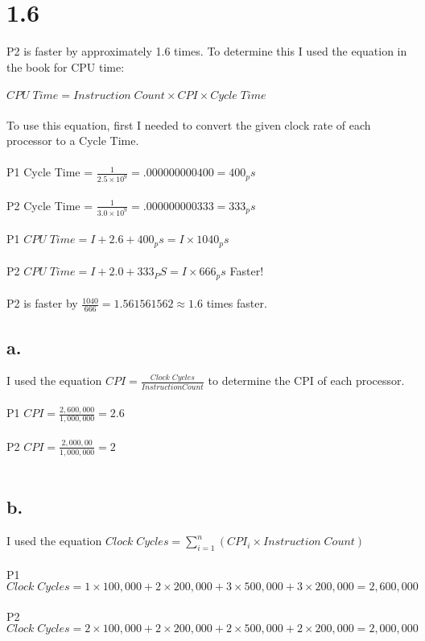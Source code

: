 \documentclass[12pt,letterpaper]{article}
\begin{document}
\section*{1.6}
P2 is faster by approximately 1.6 times. To determine this I used the equation in the book for CPU time:\\\\
$CPU\;Time = Instruction\;Count \times CPI \times Cycle\;Time$\\\\
To use this equation, first I needed to convert the given clock rate of each processor to a Cycle Time.\\\\
P1 Cycle Time = $\frac{1}{2.5 \times 10^{9}} = .000000000400 = 400_ps$\\\\
P2 Cycle Time = $\frac{1}{3.0 \times 10^{9}} = .000000000333 = 333_ps$\\\\
P1 $CPU\;Time = I + 2.6 + 400_ps = I \times 1040_ps$\\\\
P2 $CPU\;Time = I + 2.0 + 333_PS = I \times 666_ps$  Faster!\\\\
P2 is faster by $\frac{1040}{666} = 1.561561562 \approx 1.6$ times faster.
\subsection*{a.}
I used the equation $CPI = \frac{Clock\;Cycles}{Instruction Count}$ to determine the CPI of each processor.\\\\
P1 $CPI = \frac{2,600,000}{1,000,000} = 2.6$\\\\
P2 $CPI = \frac{2,000,00}{1,000,000} = 2$\\\\
\subsection*{b.}
I used the equation $ Clock\;Cycles = \sum\limits_{i=1}^n (CPI_i \times Instruction\;Count)$\\\\
P1 $Clock\;Cycles = 1\times 100,000 + 2\times200,000+3\times500,000 + 3\times 200,000 = 2,600,000$\\\\
P2 $Clock\;Cycles = 2\times 100,000 + 2\times200,000+2\times500,000 + 2\times 200,000 = 2,000,000$\\\\
\end{document}
